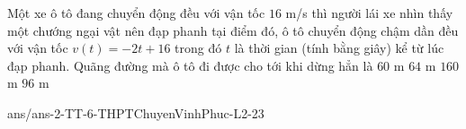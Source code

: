 \begin{ex}%
	Một xe ô tô đang chuyển động đều với vận tốc $16$ m/s thì người lái xe nhìn thấy một chướng ngại vật nên đạp phanh tại điểm đó, ô tô chuyển động chậm dần đều với vận tốc $v(t)=-2t+16$ trong đó $t$ là thời gian (tính bằng giây) kể từ lúc đạp phanh. Quãng đường mà ô tô đi được cho tới khi dừng hẳn là
	\choice
	{$60$ m}
	{\True $64$ m}
	{$160$ m}
	{$96$ m}
\end{ex}

\begin{indapan}{10}
	{ans/ans-2-TT-6-THPTChuyenVinhPhuc-L2-23}
\end{indapan}
